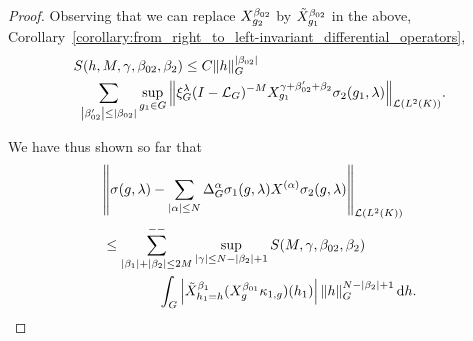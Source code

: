 \begin{proof}
    Observing that we can replace $\LeftDifferentialOperator [g_2] {\beta_{02}}$ by $\RightDifferentialOperator [g_1] {\beta_{02}}$ in the above,
    Corollary~\ref{corollary:from_right_to_left-invariant_differential_operators},
    \begin{align}
        &S(h, M, \gamma, \beta_{02}, \beta_2)
        \leq C \norm [\Group] h^{\abs {\beta_{02}}} \notag\\
        &\ \sum_{\abs {\beta'_{02}} \leq \abs {\beta_{02}}}
        \sup_{g_1 \in \Group}
        \norm [\Lin {\Lebesgue 2 \CompactGroup}] {%
            \Rep \lambda \BesselPotentialSquared {-M}
            \LeftDifferentialOperator [g_1] {\gamma + \beta'_{02} + \beta_2}
            \sigma_2(g_1, \lambda)
        }.
        \label{eq:composition_formula:bound_on_S}
    \end{align}

    We have thus shown so far that
    \begin{align}
        &\norm [\Lin {\Lebesgue 2 \CompactGroup}] {\sigma(g, \lambda) - \sum_{\abs \alpha \leq N} \DifferenceOperatorOrder \alpha \sigma_1(g, \lambda) \TaylorLeftDifferentialOperator \alpha \sigma_2(g, \lambda)} \notag\\
        &\leq
        \lcsum{\abs {\beta_1} + \abs {\beta_2} \leq 2M}
        \sup_{\abs \gamma \leq N - \abs {\beta_2} + 1}
        S(M, \gamma, \beta_{02}, \beta_2) \notag\\
        &\qquad \qquad
        \int_\Group \abs {\RightDifferentialOperator[h_1 = h] {\beta_1} (\LeftDifferentialOperator [g] {\beta_{01}} \kappa_{1, g})(h_1)} \norm [\Group] h^{N - \abs {\beta_2} + 1} \dd h.
        \label{eq:composition_formula:bound_on_the_remainder}
    \end{align}


\end{proof}
